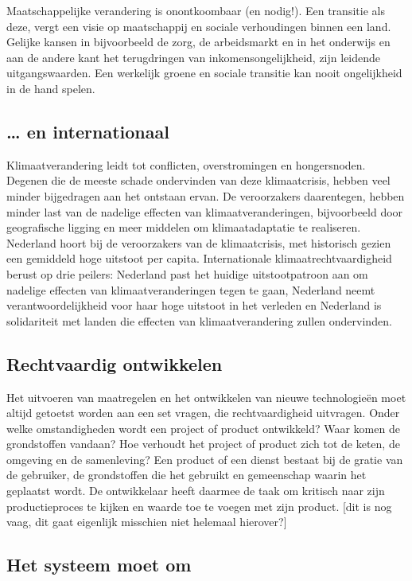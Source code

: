 Maatschappelijke verandering is onontkoombaar (en nodig!). Een transitie als deze, vergt een visie op maatschappij en sociale verhoudingen binnen een land. Gelijke kansen in bijvoorbeeld de zorg, de arbeidsmarkt en in het onderwijs en aan de andere kant het terugdringen van inkomensongelijkheid, zijn leidende uitgangswaarden. Een werkelijk groene en sociale transitie kan nooit ongelijkheid in de hand spelen.

\subsection{… en internationaal}
Klimaatverandering leidt tot conflicten, overstromingen en hongersnoden. Degenen die de meeste schade ondervinden van deze klimaatcrisis, hebben veel minder bijgedragen aan het ontstaan ervan. De veroorzakers daarentegen, hebben minder last van de nadelige effecten van klimaatveranderingen, bijvoorbeeld door geografische ligging en meer middelen om klimaatadaptatie te realiseren. Nederland hoort bij de veroorzakers van de klimaatcrisis, met historisch gezien een gemiddeld hoge uitstoot per capita. Internationale klimaatrechtvaardigheid berust op drie peilers: Nederland past het huidige uitstootpatroon aan om nadelige effecten van klimaatveranderingen tegen te gaan, Nederland neemt verantwoordelijkheid voor haar hoge uitstoot in het verleden en Nederland is solidariteit met landen die effecten van klimaatverandering zullen ondervinden.

\subsection{Rechtvaardig ontwikkelen}
Het uitvoeren van maatregelen en het ontwikkelen van nieuwe technologieën moet altijd getoetst worden aan een set vragen, die rechtvaardigheid uitvragen. Onder welke omstandigheden wordt een project of product ontwikkeld? Waar komen de grondstoffen vandaan? Hoe verhoudt het project of product zich tot de keten, de omgeving en de samenleving? Een product of een dienst bestaat bij de gratie van de gebruiker, de grondstoffen die het gebruikt en gemeenschap waarin het geplaatst wordt. De ontwikkelaar heeft daarmee de taak om kritisch naar zijn productieproces te kijken en waarde toe te voegen met zijn product. [dit is nog vaag, dit gaat eigenlijk misschien niet helemaal hierover?]

\subsection{Het systeem moet om}

